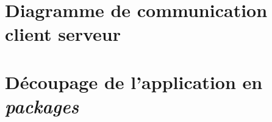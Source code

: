 \documentclass[11pt,dvipsnames,svgnames]{report}
\begin{document}
\section{Diagramme de communication client serveur}

\section{Découpage de l'application en \emph{packages}}


%
%
%
%
\end{document}
